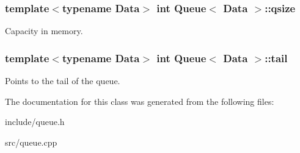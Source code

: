 \subsubsection[{qsize}]{\setlength{\rightskip}{0pt plus 5cm}template$<$typename Data$>$ int {\bf Queue}$<$ Data $>$\+::qsize\hspace{0.3cm}{\ttfamily [private]}}\hypertarget{classQueue_a9bfa5d2a390a36f141191ae93e144d87}{}\label{classQueue_a9bfa5d2a390a36f141191ae93e144d87}
Capacity in memory. 
\subsubsection[{tail}]{\setlength{\rightskip}{0pt plus 5cm}template$<$typename Data$>$ int {\bf Queue}$<$ Data $>$\+::tail\hspace{0.3cm}{\ttfamily [private]}}\hypertarget{classQueue_ab10ac5c08c3e0b047fca58f67fb06148}{}\label{classQueue_ab10ac5c08c3e0b047fca58f67fb06148}
Points to the tail of the queue. 

The documentation for this class was generated from the following files\+:\begin{DoxyCompactItemize}
\item 
include/queue.\+h\item 
src/queue.\+cpp\end{DoxyCompactItemize}
